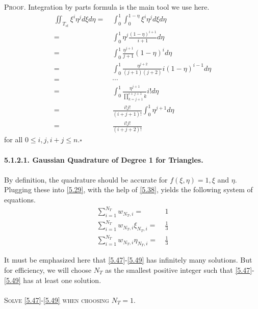 \documentclass[a4paper]{article}
\numberwithin{equation}{section}
\begin{document}
\textsc{Proof.} Integration by parts formula is the main tool we use here.
\begin{align}
\iint_{{T_{st}}} {{\xi ^i}{\eta ^j}d\xi d\eta } =&\ \int_0^1 {\int_0^{1 - \eta } {{\xi ^i}{\eta ^j}d\xi d\eta } } \\
 =&\ \int_0^1 {{\eta ^j}\frac{{{{\left( {1 - \eta } \right)}^{i + 1}}}}{{i + 1}}d\eta } \\
 =&\ \int_0^1 {\frac{{{\eta ^{j + 1}}}}{{j + 1}}{{\left( {1 - \eta } \right)}^i}d\eta } \\
 =&\ \int_0^1 {\frac{{{\eta ^{j + 2}}}}{{\left( {j + 1} \right)\left( {j + 2} \right)}}i{{\left( {1 - \eta } \right)}^{i - 1}}d\eta } \\
 =&\  \cdots \\
 =&\ \int_0^1 {\frac{{{\eta ^{j + 1}}}}{{\prod\limits_{k = j + 1}^{i + j + 1} k }}i!d\eta } \\
 =&\ \frac{{i!j!}}{{\left( {i + j + 1} \right)!}}\int_0^1 {{\eta ^{j + 1}}d\eta } \\
 =&\ \frac{{i!j!}}{{\left( {i + j + 2} \right)!}}
\end{align}
for all $0 \le i,j,i + j \le n$.\hfill $\square$\\
\\
\textbf{5.1.2.1. Gaussian Quadrature of Degree 1 for Triangles.}\\
\\
By definition, the quadrature should be accurate for $f\left( {\xi ,\eta } \right) = 1,\xi$ and $\eta $. Plugging these into \eqref{5.29}, with the help of \eqref{5.38}, yields the following system of equations.
\begin{align}
\label{5.47}
\sum\limits_{i = 1}^{{N_T}} {{w_{{N_T},i}}}  =&\ 1\\
\sum\limits_{i = 1}^{{N_T}} {{w_{{N_T},i}}{\xi _{{N_T},i}}}  =&\ \frac{1}{3}\\
\sum\limits_{i = 1}^{{N_T}} {{w_{{N_T},i}}{\eta _{{N_T},i}}}  =&\ \frac{1}{3} \label{5.49}
\end{align}

It must be emphasized here that \eqref{5.47}-\eqref{5.49} has infinitely many solutions. But for efficiency, we will choose $N_T$ as the smallest positive integer such that \eqref{5.47}-\eqref{5.49} has at least one solution.\\
\\
\textsc{Solve \eqref{5.47}-\eqref{5.49} when choosing $N_T=1$.} 
\end{document}
